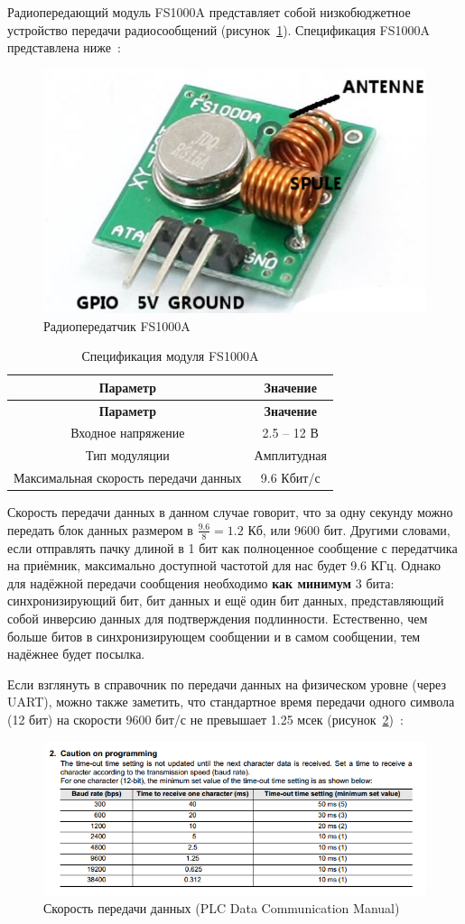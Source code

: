 Радиопередающий модуль FS1000A представляет собой низкобюджетное устройство передачи радиосообщений (рисунок~\ref{fig:fs1000a}). Спецификация FS1000A представлена ниже~\cite{fs1000a:specs}:

\begin{figure}[ht]
    \includegraphics[width=.3\linewidth]{Figures/fs1000a.jpg}
    \caption{Радиопередатчик FS1000A}
    \label{fig:fs1000a}
\end{figure}

\begin{longtable}[c]{|c|c|}
    \caption{Спецификация модуля FS1000A}
    \label{tab:specs}\\
    \hline
    \textbf{Параметр} & \textbf{Значение}\\
    \hline
    \endfirsthead
    \hline
    \textbf{Параметр} & \textbf{Значение}\\
    \hline
    \endhead
        Входное напряжение & 2.5 -- 12 В\\
        \hline
        Тип модуляции & Амплитудная\\
        \hline
        Максимальная скорость передачи данных & 9.6 Кбит/с\\
        \hline
\end{longtable}

Скорость передачи данных в данном случае говорит, что за одну секунду можно передать блок данных размером в $\frac{9.6}{8} = 1.2$ Кб, или 9600 бит. Другими словами, если отправлять пачку длиной в 1 бит как полноценное сообщение с передатчика на приёмник, максимально доступной частотой для нас будет 9.6 КГц. Однако для надёжной передачи сообщения необходимо \textbf{как минимум} 3 бита: синхронизирующий бит, бит данных и ещё один бит данных, представляющий собой инверсию данных для подтверждения подлинности. Естественно, чем больше битов в синхронизирующем сообщении и в самом сообщении, тем надёжнее будет посылка.

Если взглянуть в справочник по передачи данных на физическом уровне (через UART), можно также заметить, что стандартное время передачи одного символа (12 бит) на скорости 9600 бит/с не превышает 1.25 мсек (рисунок~\ref{fig:mits})~\cite{mits:fx}:

\begin{figure}[ht]
    \includegraphics[width=1\linewidth]{Figures/mits.png}
    \caption{Скорость передачи данных (PLC Data Communication Manual)}
    \label{fig:mits}
\end{figure}
